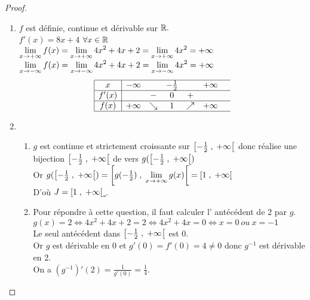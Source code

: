 \begin{proof}
\begin{enumerate}
\item $ f $ est définie, continue et dérivable sur $ \mathbb{R}. $\\
$ f'(x) = 8x+4$  $\forall x\in \mathbb{R} $\\
$\displaystyle \lim_{x \to +\infty}f(x)= \displaystyle\lim_{x \to +\infty}4x^{2}+4x+2=\displaystyle\lim_{x \to +\infty}4x^{2}=+\infty$\\
$\displaystyle \lim_{x \to -\infty}f(x)=\displaystyle \lim_{x \to -\infty}4x^{2}+4x+2=\displaystyle\lim_{x \to -\infty}4x^{2}=+\infty$
$$
\begin{array}{|c|cccccc}
\hline
x & -\infty & & -\frac{1}{2} & & +\infty & \\
\hline
f'(x) & & - & 0 & + & & \\
\hline
f(x) & +\infty & \searrow & 1 & \nearrow & +\infty & \\
\hline
\end{array}
$$
\item 
\begin{enumerate}
\item $ g $ est continue et strictement croissante  sur  $ \left[-\frac{1}{2} \;,\; +\infty\right[ $ donc réalise une bijection $ \left[-\frac{1}{2} \;,\; +\infty\right[ $ de vers  $g( \left[-\frac{1}{2} \;,\; +\infty\right[)$ \\Or  $g( \left[-\frac{1}{2} \;,\; +\infty\right[)=\left[g(-\frac{1}{2}) \;,\; \displaystyle\lim_{x \to +\infty}g(x)\right[=\left[1 \;,\; +\infty\right[ $ \\ D'où \underline{$J= \left[1 \;,\; +\infty\right[ $ }.
\item Pour répondre à cette question, il  faut calculer  l' antécédent de $ 2 $ par $ g. $\\ $ g(x)=2\Leftrightarrow 4x^{2}+4x+2=2\Leftrightarrow 4x^{2}+4x=0\Leftrightarrow x= 0 \ ou\  x= -1$\\ Le seul antécédent dans $ \left[-\frac{1}{2} \;,\; +\infty\right[ $ est  0.\\
Or $ g $ est dérivable en 0 et $ g'(0)=f'(0)=4 \neq 0 $ donc  $ g^{-1} $  est dérivable en 2.\\
On a $(g^{-1})'(2)=\frac{1}{g'(0)}=\frac{1}{4}.  $
\end{enumerate}

\end{enumerate}
\end{proof}



